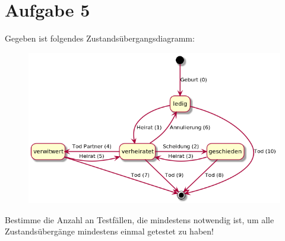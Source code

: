 \newpage
\section*{Aufgabe 5}

Gegeben ist folgendes Zustandsübergangsdiagramm:

\begin{center}
\begin{figure}[ht]
  \centering
  \includegraphics[width=\textwidth]{Uebungen/beziehungen.png}
\end{figure}
\end{center}

Bestimme die Anzahl an Testfällen, die mindestens notwendig ist, um alle Zustandsübergänge mindestens einmal getestet zu haben!

